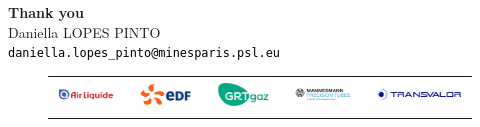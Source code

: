\documentclass[9pt]{beamer}
\begin{document}
\begin{frame}{}
    \noindent\makebox[\linewidth]{\rule{1.0\textwidth}{0.4pt}}

    \vspace{0.3cm}

    \begin{center}
        \Huge{\textcolor{MINESBlue}{\textbf{Thank you}}} \\
        \vspace{1.0cm}
        \normalsize Daniella LOPES PINTO \\
        \vspace{0.1cm}
        \small \texttt{\textcolor{black}{daniella.lopes\_pinto@minesparis.psl.eu}}
    \end{center}

    \vspace{0.3cm}

    \noindent\makebox[\linewidth]{\rule{1.0\textwidth}{0.4pt}}

    \begin{figure}
        \begin{tabular}{c}
            \includegraphics[width=1.0\textwidth]{TEMPLATE_IMAGES/logos_MESSIAH.pdf} \\
        \end{tabular}
    \end{figure}

\end{frame}
\end{document}
